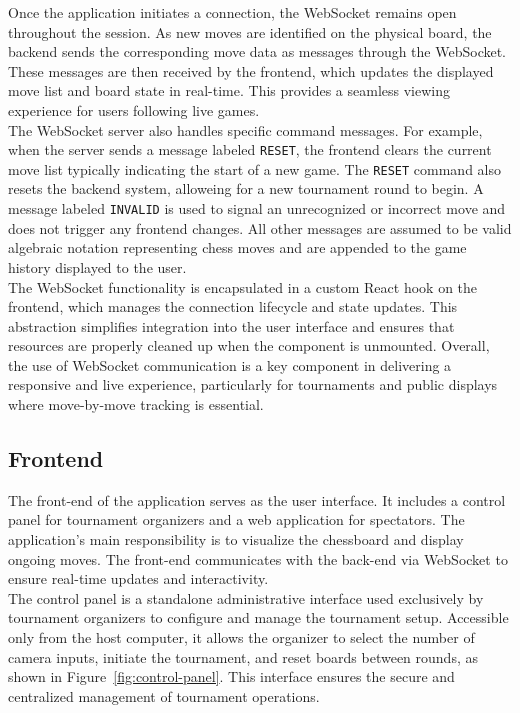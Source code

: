 Once the application initiates a connection, the WebSocket remains open throughout the session. As new moves are identified on the physical board, the backend sends the corresponding move data as messages through the WebSocket. These messages are then received by the frontend, which updates the displayed move list and board state in real-time. This provides a seamless viewing experience for users following live games. \\

The WebSocket server also handles specific command messages. For example, when the server sends a message labeled \texttt{RESET}, the frontend clears the current move list typically indicating the start of a new game. The \texttt{RESET} command also resets the backend system, alloweing for a new tournament round to begin. A message labeled \texttt{INVALID} is used to signal an unrecognized or incorrect move and does not trigger any frontend changes. All other messages are assumed to be valid algebraic notation representing chess moves and are appended to the game history displayed to the user. \\

The WebSocket functionality is encapsulated in a custom React hook on the frontend, which manages the connection lifecycle and state updates. This abstraction simplifies integration into the user interface and ensures that resources are properly cleaned up when the component is unmounted. Overall, the use of WebSocket communication is a key component in delivering a responsive and live experience, particularly for tournaments and public displays where move-by-move tracking is essential.

\subsection{Frontend}
\label{subsec:results-frontend}
The front-end of the application serves as the user interface. It includes a control panel for tournament organizers and a web application for spectators. The application's main responsibility is to visualize the chessboard and display ongoing moves. The front-end communicates with the back-end via WebSocket to ensure real-time updates and interactivity. \\

The control panel is a standalone administrative interface used exclusively by tournament organizers to configure and manage the tournament setup. Accessible only from the host computer, it allows the organizer to select the number of camera inputs, initiate the tournament, and reset boards between rounds, as shown in Figure~\ref{fig:control-panel}. This interface ensures the secure and centralized management of tournament operations. \\

